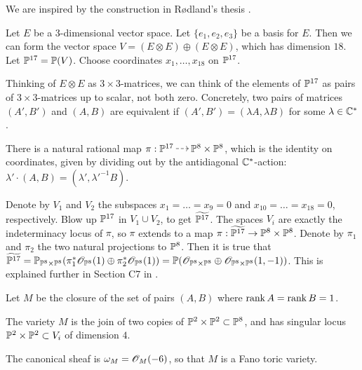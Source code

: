We are inspired by the construction in Rødland's thesis \cite{rodland_pfaffian}. 

Let $E$ be a 3-dimensional vector space. Let $\{e_1,e_2,e_3\}$ be a basis for $E$. Then we can form the vector space $V= (E \otimes E) \oplus (E \otimes E)$, which has dimension $18$. Let $\P^{17}=\P(V)$. Choose coordinates $x_1,\ldots,x_{18}$ on $\P^{17}$. 

Thinking of $E \otimes E$ as $3 \times 3$-matrices, we can think of the elements of $\P^{17}$ as pairs of $3 \times 3$-matrices up to scalar, not both zero. Concretely, two pairs of matrices $(A',B')$ and $(A,B)$ are equivalent if $(A',B') = (\lambda A, \lambda B)$ for some $\lambda \in \C^\ast$.

There is a natural rational map $\pi:\P^{17} \rmap \P^8 \times \P^8$, which is the identity on coordinates, given by dividing out by the antidiagonal $\C^\ast$-action: $\lambda' \cdot (A,B) = (\lambda',{\lambda'}^{-1} B)$.

Denote by $V_1$ and $V_2$ the subspaces $x_1=\ldots=x_9=0$ and $x_{10}=\ldots=x_{18}=0$, respectively. Blow up $\P^{17}$ in $V_1 \cup V_2$, to get $\widetilde{\P^{17}}$. The spaces $V_i$ are exactly the indeterminacy locus of $\pi$, so $\pi$ extends to a map $\pi:\widetilde{\P^{17}} \to \P^8 \times \P^8$. Denote by $\pi_1$ and $\pi_2$ the two natural projections to $\P^8$. Then it is true that $\widetilde{\P^{17}}= \P_{\P^8 \times \P^8}(\pi_1^\ast \OO_{\P^8}(1) \oplus \pi_2^\ast \OO_{\P^8}(1))=\P(\OO_{\P^8\times \P^8} \oplus \OO_{\P^8 \times \P^8}(1,-1))$. This is explained further in Section C7 in \cite{altman_joins}.

Let $M$ be the closure of the set of pairs $(A,B)$ where $\rank A = \rank B = 1$.  

\begin{proposition}
\label{prop:m}
The variety $M$ is the join of two copies of $\P^2 \times \P^2 \subset \P^8$, and has singular locus $\P^2 \times \P^2 \subset V_i$ of dimension $4$.

The canonical sheaf is $\omega_M = \OO_M(-6)$, so that $M$ is a Fano toric variety.
\end{proposition}

